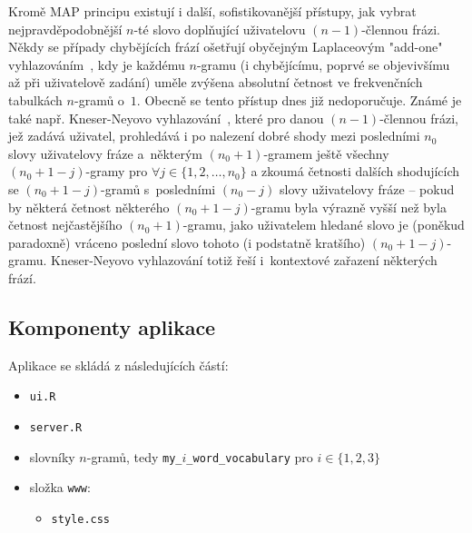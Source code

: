 Kromě MAP principu
existují i další, sofistikovanější přístupy, jak vybrat
nejpravděpodobnější $n$-té slovo doplňující uživatelovu $(n - 1)$-člennou
frázi. Někdy se případy chybějících frází ošetřují obyčejným
Laplaceovým
"add-one" vyhlazováním~\cite{Chen1996}, kdy je každému $n$-gramu%
(i chybějícímu, poprvé se objevivšímu až při uživatelově zadání) uměle
zvýšena absolutní četnost ve frekvenčních tabulkách \mbox{$n$-gramů} o~$1$.
Obecně se tento přístup dnes již nedoporučuje. Známé je také
např. \mbox{Kneser-Neyovo} vyhlazování~\cite{Jurafsky2009},
které pro danou $(n - 1)$-člennou frázi,
jež zadává uživatel, prohledává
i po nalezení dobré shody mezi posledními $n_{0}$ slovy uživatelovy fráze
a~některým $(n_{0} + 1)$-gramem ještě všechny $(n_{0} + 1 - j)$-gramy pro
$\forall j \in \{1, 2, \ldots, n_{0}\}$ a zkoumá četnosti dalších shodujících
se $(n_{0} + 1 - j)$-gramů s~posledními $(n_{0} - j)$ slovy uživatelovy
fráze -- pokud by některá četnost některého $(n_{0} + 1 - j)$-gramu byla
výrazně vyšší než byla četnost nejčastějšího $(n_{0} + 1)$-gramu,
jako uživatelem hledané slovo je (poněkud paradoxně) vráceno poslední
slovo tohoto (i podstatně kratšího) $(n_{0} + 1 - j)$-gramu. Kneser-Neyovo
vyhlazování totiž řeší
i~kontextové zařazení některých frází.


\subsection{Komponenty aplikace}

Aplikace se skládá z následujících částí:

\begin{itemize}
  \item \texttt{ui.R}
  \item \texttt{server.R}
  \item slovníky $n$-gramů, tedy \texttt{my\_$i$\_word\_vocabulary}
        pro $i \in \{1, 2, 3\}$
  \item složka \texttt{www}:
  \begin{itemize}
    \item \texttt{style.css}
  \end{itemize}
\end{itemize}


